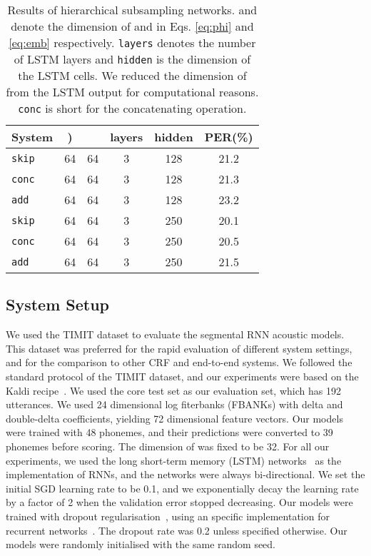 \documentclass[a4paper]{article}
\begin{document}
 \begin{table}
 \centering \small
\caption{Results of hierarchical subsampling networks.  and  denote the dimension of  and  in Eqs. \eqref{eq:phi} and \eqref{eq:emb} respectively. {\tt layers} denotes the number of LSTM layers and {\tt hidden} is the dimension of the LSTM  cells. We reduced the dimension of  from the LSTM output for computational reasons. {\tt conc} is short for the concatenating operation. }\vskip 1.5mm

\label{tab:hsrnn}
\begin{tabular}{l|ccccc}
\hline

\hline
System  & ) &  & layers & hidden &  PER(\%) \\ \hline
{\tt skip} & 64 & 64 & 3 & 128 & 21.2 \\
{\tt conc} & 64 & 64 & 3 & 128  & 21.3 \\
{\tt add}  & 64 & 64 & 3 & 128  & 23.2 \\ \hline
{\tt skip} & 64 & 64 & 3 & 250 & 20.1 \\
{\tt conc} & 64 & 64 & 3 & 250 & 20.5 \\ 
{\tt add} & 64 & 64 & 3 & 250 & 21.5  \\

\hline

\hline
\end{tabular}
\vskip-5mm
\end{table}

\subsection{System Setup}

We used the TIMIT dataset to evaluate the segmental RNN acoustic models. This dataset was preferred for the rapid evaluation of different system settings, and for the comparison to other CRF and end-to-end systems. We followed the standard protocol of the TIMIT dataset, and our experiments were based on the Kaldi recipe~\cite{povey2011kaldi}. We used the core test set as our evaluation set, which has 192 utterances. We used 24 dimensional log fiterbanks (FBANKs) with delta and double-delta coefficients, yielding 72 dimensional feature vectors. Our models were trained with 48 phonemes, and their predictions were converted to 39 phonemes before scoring. The dimension of  was fixed to be 32. For all our experiments, we used the long short-term memory (LSTM) networks~\cite{hochreiter1997long} as the implementation of RNNs, and the networks were always bi-directional. We set the initial SGD learning rate to be 0.1, and we exponentially decay the learning rate by a factor of 2 when the validation error stopped decreasing. Our models were trained with dropout regularisation~\cite{srivastava2014dropout}, using an specific implementation for recurrent networks~\cite{zaremba2014recurrent}. The dropout rate was 0.2 unless specified otherwise. Our models were randomly initialised with the same random seed.
\end{document}
